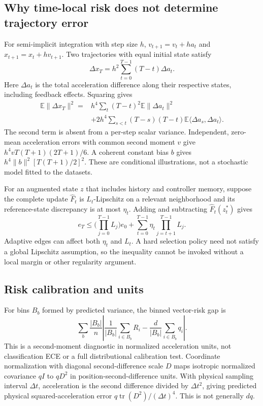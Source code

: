 \subsection{Why time-local risk does not determine trajectory error}
For semi-implicit integration with step size $h$,
$v_{t+1}=v_t+ha_t$ and $x_{t+1}=x_t+hv_{t+1}$.
Two trajectories with equal initial state satisfy
\begin{equation}
 \Delta x_T=h^2\sum_{t=0}^{T-1}(T-t)\Delta a_t.
\end{equation}
Here $\Delta a_t$ is the total acceleration difference along their respective states, including feedback effects. Squaring gives
\begin{align}
 \mathbb E\|\Delta x_T\|^2
 ={}&h^4\sum_t(T-t)^2\mathbb E\|\Delta a_t\|^2\nonumber\\
 &+2h^4\sum_{s<t}(T-s)(T-t)
       \mathbb E\langle\Delta a_s,\Delta a_t\rangle.
\end{align}
The second term is absent from a per-step scalar variance. Independent, zero-mean acceleration errors with common second moment $v$ give $h^4vT(T+1)(2T+1)/6$. A coherent constant bias $b$ gives $h^4\|b\|^2[T(T+1)/2]^2$. These are conditional illustrations, not a stochastic model fitted to the datasets.

For an augmented state $z$ that includes history and controller memory, suppose the complete update $\widehat F_t$ is $L_t$-Lipschitz on a relevant neighborhood and its reference-state discrepancy is at most $\eta_t$. Adding and subtracting $\widehat F_t(z_t^*)$ gives
\begin{equation}
 e_T\le\Big(\prod_{j=0}^{T-1}L_j\Big)e_0+
 \sum_{t=0}^{T-1}\eta_t\prod_{j=t+1}^{T-1}L_j.
\end{equation}
Adaptive edges can affect both $\eta_t$ and $L_t$. A hard selection policy need not satisfy a global Lipschitz assumption, so the inequality cannot be invoked without a local margin or other regularity argument.

\subsection{Risk calibration and units}
For bins $B_b$ formed by predicted variance, the binned vector-risk gap is
\begin{equation}
 \sum_b\frac{|B_b|}{n}\left|
 \frac{1}{|B_b|}\sum_{i\in B_b}R_i
 -\frac{d}{|B_b|}\sum_{i\in B_b}q_i\right|.
\end{equation}
This is a second-moment diagnostic in normalized acceleration units, not classification ECE or a full distributional calibration test. Coordinate normalization with diagonal second-difference scale $D$ maps isotropic normalized covariance $qI$ to $qD^2$ in position-second-difference units. With physical sampling interval $\Delta t$, acceleration is the second difference divided by $\Delta t^2$, giving predicted physical squared-acceleration error $q\operatorname{tr}(D^2)/(\Delta t)^4$. This is not generally $dq$.

